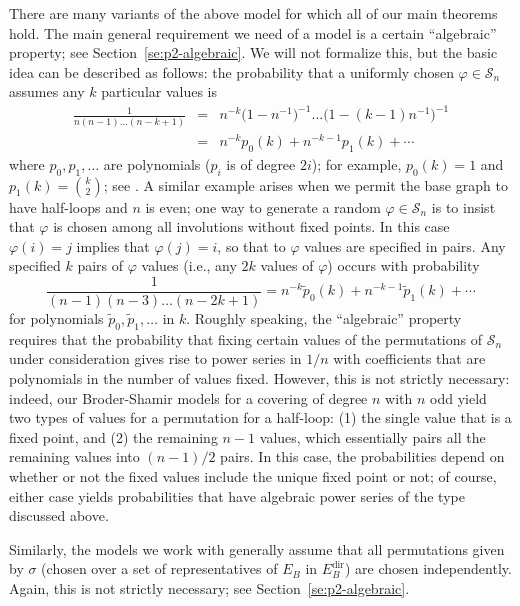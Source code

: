 \documentclass{memo-l}
\theoremstyle{plain}
\theoremstyle{definition}
\numberwithin{section}{chapter}
\numberwithin{equation}{chapter}
\newcommand{\Edir}{E^{\mathrm{dir}}}
\theoremstyle{plain}
\theoremstyle{definition}
\newcommand\cS{\mathcal{S}}
\begin{document}
There are many variants of the above model for which all of our main
theorems hold.  The main general requirement we need of a model is a
certain ``algebraic'' property; see Section~\ref{se:p2-algebraic}.
We will not formalize this, but the basic idea can be described as follows:
the probability
that a uniformly chosen
$\varphi\in \cS_n$ assumes any $k$ particular values is
\begin{eqnarray*}
\frac{1}{n(n-1)\ldots (n-k+1)}
& = &
n^{-k}\bigr(1-n^{-1}\bigl)^{-1}
\ldots \bigr(1-(k-1)n^{-1}\bigl)^{-1} 
\\
&=&
n^{-k} p_0(k) + n^{-k-1} p_1(k) + \cdots
\end{eqnarray*}
where $p_0,p_1,\ldots$ are polynomials ($p_i$ is of degree $2i$);
for example, $p_0(k)=1$ and $p_1(k) = \binom{k}{2}$; 
see \cite{friedman_random_graphs}.
A similar example arises when we permit the base graph to have half-loops
and $n$ is even; one way to generate a random $\varphi\in \cS_n$ is
to insist that $\varphi$ is chosen among all involutions without fixed
points.  In this case $\varphi(i)=j$ implies that $\varphi(j)=i$, so that
to $\varphi$ values are specified in pairs.
Any specified $k$ pairs of $\varphi$ values (i.e., any $2k$ values of
$\varphi$) occurs with probability
$$
\frac{1}{(n-1)(n-3)\ldots(n-2k+1)}
=
n^{-k} \tilde p_0(k) + n^{-k-1} \tilde p_1(k) + \cdots
$$
for polynomials $\tilde p_0,\tilde p_1,\ldots$ in $k$.
Roughly speaking, the ``algebraic'' property requires that the probability
that fixing certain values of the permutations of $\cS_n$ under 
consideration
gives rise to power series in $1/n$ with coefficients that are 
polynomials in the number of values fixed. 
However, this is not
strictly necessary: indeed, our Broder-Shamir models for a covering 
of degree $n$ with $n$ odd yield two types of values for a permutation
for a half-loop: (1) the single value that is a fixed point, and
(2) the remaining $n-1$ values, which essentially pairs all the
remaining values into $(n-1)/2$ pairs.  In this case, the probabilities
depend on whether or not the fixed values include the unique fixed point
or not; of course, either case yields probabilities that have algebraic
power series of the type discussed above.

Similarly, the models we work with generally assume that
all permutations given by $\sigma$
(chosen over a set of representatives of $E_B$ in $\Edir_B$)
are chosen independently.
Again, this is not strictly necessary; see Section~\ref{se:p2-algebraic}.


\end{document}
